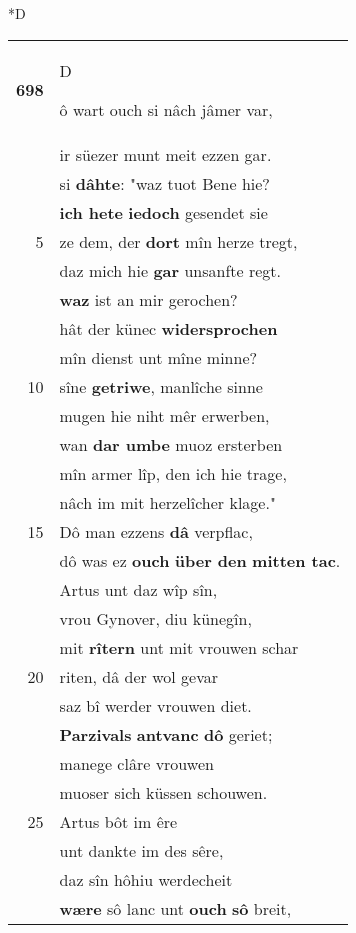 \documentclass[8pt,a4paper,notitlepage]{article}
\begin{document}
\begin{table}[ht]
\begin{minipage}[t]{0.5\linewidth}
\small
\begin{center}*D
\end{center}
\begin{tabular}{rl}
\textbf{698} & \begin{large}D\end{large}ô wart ouch si nâch jâmer var,\\ 
 & ir süezer munt meit ezzen gar.\\ 
 & si \textbf{dâhte}: "waz tuot Bene hie?\\ 
 & \textbf{ich hete} \textbf{iedoch} gesendet sie\\ 
5 & ze dem, der \textbf{dort} mîn herze tregt,\\ 
 & daz mich hie \textbf{gar} unsanfte regt.\\ 
 & \textbf{waz} ist an mir gerochen?\\ 
 & hât der künec \textbf{widersprochen}\\ 
 & mîn dienst unt mîne minne?\\ 
10 & sîne \textbf{getriwe}, manlîche sinne\\ 
 & mugen hie niht mêr erwerben,\\ 
 & wan \textbf{dar umbe} muoz ersterben\\ 
 & mîn armer lîp, den ich hie trage,\\ 
 & nâch im mit herzelîcher klage."\\ 
15 & Dô man ezzens \textbf{dâ} verpflac,\\ 
 & dô was ez \textbf{ouch} \textbf{über den} \textbf{mitten tac}.\\ 
 & Artus unt daz wîp sîn,\\ 
 & vrou Gynover, diu künegîn,\\ 
 & mit \textbf{rîtern} unt mit vrouwen schar\\ 
20 & riten, dâ der wol gevar\\ 
 & saz bî werder vrouwen diet.\\ 
 & \textbf{Parzivals} \textbf{antvanc} \textbf{dô} geriet;\\ 
 & manege clâre vrouwen\\ 
 & muoser sich küssen schouwen.\\ 
25 & Artus bôt im êre\\ 
 & unt dankte im des sêre,\\ 
 & daz sîn hôhiu werdecheit\\ 
 & \textbf{wære} sô lanc unt \textbf{ouch} \textbf{sô} breit,\\ 

\end{tabular}
\end{minipage}
\end{table}
\end{document}
